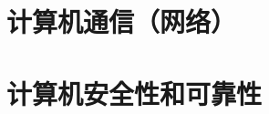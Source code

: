 \documentclass[UTF8]{NatureUniverse}
\begin{document}
\section{计算机通信（网络）}

\section{计算机安全性和可靠性}
\end{document}
